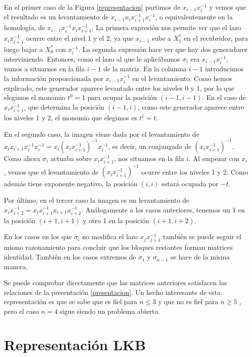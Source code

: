 \documentclass[TFG.tex]{subfiles}
\begin{document}
En el primer caso de la Figura \ref{representacion} partimos de $x_{i-1}x_i^{-1}$ y vemos que el resultado es un levantamiento de $x_{i-1}x_ix_{i+1}^{-1}x_i^{-1}$, o equivalentemente en la homología, de $x_{i-1}x_i^{-1}x_ix_{i+1}^{-1}$. La primera expresión nos permite ver que el lazo $x_ix_{i+1}^{-1}$ ocurre entre el nivel 1 y el 2, ya que $x_{i-1}$ sube a $X^*_1$ en el recubridor, para luego bajar a $X^*_0$ con $x_i^{-1}$. La segunda expresión hace ver que hay dos generadores interviniendo. Entonces, como el lazo al que le aplicábamos $\sigma_i$ era $x_{i-1}x_i^{-1}$, vamos a situarnos en la fila $i-1$ de la matriz. En la columna $i-1$ introducimos la información proporcionada por $x_{i-1}x_i^{-1}$ en el levantamiento. Como hemos explicado, este generador aparece levantado entre los niveles 0 y 1, por lo que elegimos el monomio $t^0=1$ para ocupar la posición $(i-1,i-1)$. En el caso de $x_ix_{i+1}^{-1}$, que determina la posición $(i-1,i)$, como este generador aparece entre los niveles 1 y 2, el monomio que elegimos es $t^1=t$. 

En el segundo caso, la imagen viene dada por el levantamiento de $x_ix_{i+1}x_i^{-1}x_i^{-1}=x_i(x_ix_{i+1}^{-1})^{-1}x_i^{-1}$, es decir, un conjungado de $(x_ix_{i+1}^{-1})^{-1}$. Como ahora $\sigma_i$ actuaba sobre $x_ix_{i+1}^{-1}$, nos situamos en la fila $i$. Al empezar con $x_i$, vemos que el levantamiento de $(x_ix_{i+1}^{-1})^{-1}$ ocurre entre los niveles 1 y 2. Como además tiene exponente negativo, la posición $(i,i)$ estará ocupada por $-t$. 

Por último, en el tercer caso la imagen es un levantamiento de $x_ix_{i+2}^{-1}=x_ix_{i+1}^{-1}x_{i+1}x_{i+2}^{-1}$. Análogamente a los casos anteriores, tenemos un 1 en la posición $(i+1,i+1)$ y otro 1 en la posición $(i+1,i+2)$. 

En los casos en los que $\sigma_i$ no modifica el lazo $x_jx_{j+1}^{-1}$ también se puede seguir el mismo razonamiento para concluir que los bloques restantes forman matrices identidad. También en los casos extremos de $\sigma_1$ y $\sigma_{n-1}$ se hace de la misma manera.

Se puede comprobar directamente que las matrices anteriores satisfacen las relaciones de la presentación \ref{presentacion}. Un hecho interesante de esta representación es que se sabe que es fiel para $n\leq 3$ \cite{Birman} y que no es fiel para $n\geq 5$ \cite{Bil}\cite{LP}, pero el caso $n=4$ sigue siendo un problema abierto.

\section{Representación LKB}
\end{document}
